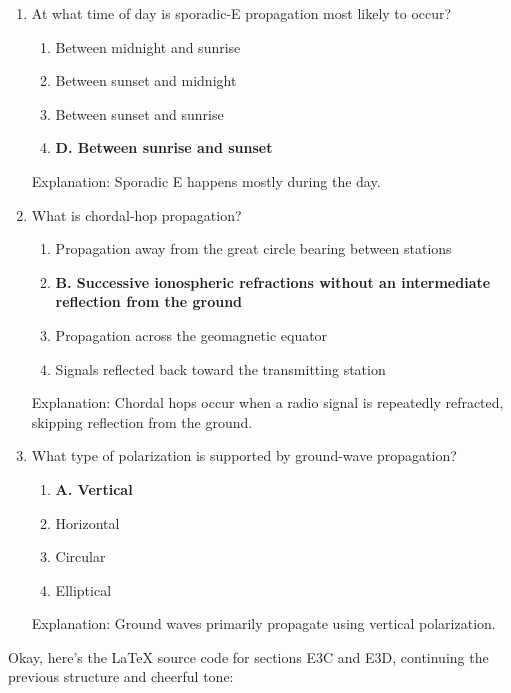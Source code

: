 \begin{enumerate}
   \item At what time of day is sporadic-E propagation most likely to occur?
       \begin{enumerate}
         \item  Between midnight and sunrise
         \item  Between sunset and midnight
        \item  Between sunset and sunrise
         \item \textbf{D. Between sunrise and sunset}
       \end{enumerate}
    \textcolor{myred}{Explanation:}
      Sporadic E happens mostly during the day.

       \item What is chordal-hop propagation?
      \begin{enumerate}
          \item  Propagation away from the great circle bearing between stations
       \item \textbf{B. Successive ionospheric refractions without an intermediate reflection from the ground}
       \item  Propagation across the geomagnetic equator
      \item  Signals reflected back toward the transmitting station
     \end{enumerate}
        \textcolor{myred}{Explanation:}
        Chordal hops occur when a radio signal is repeatedly refracted, skipping reflection from the ground.

      \item What type of polarization is supported by ground-wave propagation?
        \begin{enumerate}
          \item \textbf{A. Vertical}
        \item  Horizontal
      \item  Circular
    \item  Elliptical
      \end{enumerate}
     \textcolor{myred}{Explanation:}
     Ground waves primarily propagate using vertical polarization.
\end{enumerate}


Okay, here's the LaTeX source code for sections E3C and E3D, continuing the previous structure and cheerful tone:

